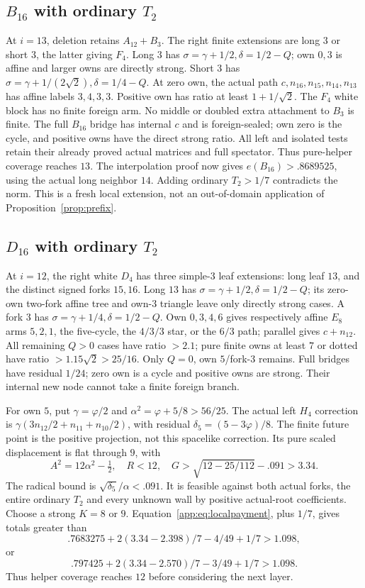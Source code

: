 \documentclass[11pt]{article}
\theoremstyle{definition}
\theoremstyle{remark}
\begin{document}
\subsection{\(B_{16}\) with ordinary \(T_2\)}
At \(i=13\), deletion retains \(A_{12}+B_3\).
The right finite extensions are long \(3\) or
short \(3\), the latter giving \(F_4\).
Long \(3\) has
\(\sigma=\gamma+1/2,\delta=1/2-Q\);
own \(0,3\) is affine and larger owns are
directly strong.
Short \(3\) has
\(\sigma=\gamma+1/(2\sqrt2),\delta=1/4-Q\).
At zero own, the actual path
\(c,n_{16},n_{15},n_{14},n_{13}\) has affine
labels \(3,4,3,3\).
Positive own has ratio at least
\(1+1/\sqrt2\).
The \(F_4\) white block has no finite foreign
arm. No middle or doubled extra attachment
to \(B_3\) is finite.
The full \(B_{16}\) bridge has internal \(c\)
and is foreign-sealed; own zero is the cycle,
and positive owns have the direct strong ratio.
All left and isolated tests retain their
already proved actual matrices and full spectator.
Thus pure-helper coverage reaches \(13\).
The interpolation proof now gives
\(e(B_{16})>.8689525\), using the actual long
neighbor \(14\). Adding ordinary \(T_2>1/7\)
contradicts the norm. This is a fresh local
extension, not an out-of-domain application
of Proposition~\ref{prop:prefix}.

\subsection{\(D_{16}\) with ordinary \(T_2\)}
At \(i=12\), the right white \(D_4\) has
three simple-\(3\) leaf extensions: long leaf
\(13\), and the distinct signed forks \(15,16\).
Long \(13\) has
\(\sigma=\gamma+1/2,\delta=1/2-Q\);
its zero-own two-fork affine tree and own-\(3\)
triangle leave only directly strong cases.
A fork \(3\) has
\(\sigma=\gamma+1/4,\delta=1/2-Q\).
Own \(0,3,4,6\) gives respectively affine
\(E_8\) arms \(5,2,1\), the five-cycle,
the \(4/3/3\) star, or the \(6/3\) path;
parallel gives \(c+n_{12}\).
All remaining \(Q>0\) cases have ratio \(>2.1\);
pure finite owns at least \(7\) or dotted have
ratio \(>1.15\sqrt2>25/16\).
Only \(Q=0\), own \(5\)/fork-\(3\) remains.
Full bridges have residual \(1/24\);
zero own is a cycle and positive owns are
strong. Their internal new node cannot
take a finite foreign branch.

For own \(5\), put \(\gamma=\varphi/2\) and
\(\alpha^2=\varphi+5/8>56/25\).
The actual left \(H_4\) correction is
\(\gamma(3n_{12}/2+n_{11}+n_{10}/2)\),
with residual \(\delta_5=(5-3\varphi)/8\).
The finite future point is the positive
projection, not this spacelike correction.
Its pure scaled displacement is flat
through \(9\), with
\[
 A^2=12\alpha^2-\tfrac12,\quad
 R<12,\quad
 G>\sqrt{12-25/112}-.091>3.34.
\]
The radical bound is
\(\sqrt{\delta_5}/\alpha<.091\).
It is feasible against both actual forks,
the entire ordinary \(T_2\) and every unknown
wall by positive actual-root coefficients.
Choose a strong \(K=8\) or \(9\).
Equation~\eqref{app:eq:localpayment}, plus \(1/7\),
gives totals greater than
\[
 .7683275+2(3.34-2.398)/7-4/49+1/7>1.098,
\]
or
\[
 .797425+2(3.34-2.570)/7-3/49+1/7>1.098.
\]
Thus helper coverage reaches \(12\) before
considering the next layer.
\end{document}

